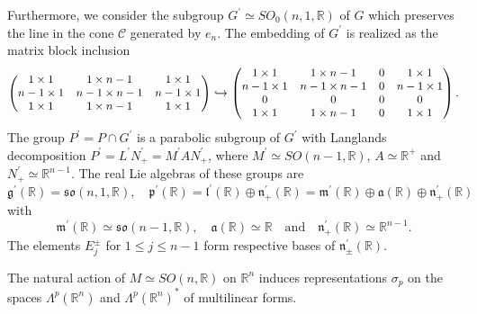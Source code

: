 \documentclass[a4paper,12pt,reqno]{amsart}
\numberwithin{theorem}{subsection}
\numberwithin{equation}{section}
\begin{document}
Furthermore, we consider the subgroup $G^\prime \simeq SO_0(n,1,{\mathbb{R}})$ of $G$
which preserves the line in the cone $\mathcal{C}$ generated by $e_n$. The
embedding of $G^\prime$ is realized as the matrix block inclusion
\begin{align*}
\begin{small}
\begin{pmatrix}
         1\times 1 & 1\times n-1 & 1\times 1\\
         n-1\times 1 & n-1\times n-1 & n-1\times 1\\
         1\times 1 & 1\times n-1 & 1\times 1\\
\end{pmatrix} \hookrightarrow
\begin{pmatrix}
          1\times 1 & 1\times n-1 & 0 & 1 \times 1\\
          n-1\times 1 & n-1\times n-1 & 0 & n-1\times 1 \\
          0 & 0 & 0 & 0         \\
          1\times 1 & 1\times n-1 & 0 & 1\times 1 \\
\end{pmatrix}
\end{small}.
\end{align*}
The group $P^\prime = P \cap G^\prime$ is a parabolic subgroup of $G^\prime $
with Langlands decomposition $P^\prime = L^\prime N^\prime_+ = M^\prime A
N^\prime_+$, where $M^\prime\simeq SO(n-1,{\mathbb{R}})$, $A \simeq {\mathbb{R}}^+$ and $N_+^\prime
\simeq {\mathbb{R}}^{n-1}$. The real Lie algebras of these groups are
\begin{equation}\label{eq:LieAlgebras'}
   {{\mathfrak g}}^\prime({\mathbb{R}}) = \mathfrak{so}(n,1,{\mathbb{R}}), \quad {{\mathfrak p}}^\prime({\mathbb{R}}) = {{\mathfrak l}}^\prime({\mathbb{R}}) \oplus {{\mathfrak n}}^\prime_+({\mathbb{R}})
   = {{\mathfrak m}}^\prime({\mathbb{R}}) \oplus {{\mathfrak a}}({\mathbb{R}}) \oplus {{\mathfrak n}}^\prime_+({\mathbb{R}})
\end{equation}
with
\begin{equation*}
   {{\mathfrak m}}^\prime({\mathbb{R}}) \simeq \mathfrak{so}(n-1,{\mathbb{R}}), \quad {{\mathfrak a}}({\mathbb{R}}) \simeq {\mathbb{R}} \quad \mbox{and} \quad
   {{\mathfrak n}}^\prime_+({\mathbb{R}}) \simeq {\mathbb{R}}^{n-1}.
\end{equation*}
The elements $E_j^\pm$ for $1 \le j \le n-1$ form respective bases of
${{\mathfrak n}}^\prime_\pm({\mathbb{R}})$.

The natural action of $M \simeq SO(n,{\mathbb{R}})$ on ${\mathbb{R}}^n$ induces representations
$\sigma_p$ on the spaces $\Lambda^p({\mathbb{R}}^{n})$ and $\Lambda^p({\mathbb{R}}^{n})^*$ of
multilinear forms.
\end{document}
